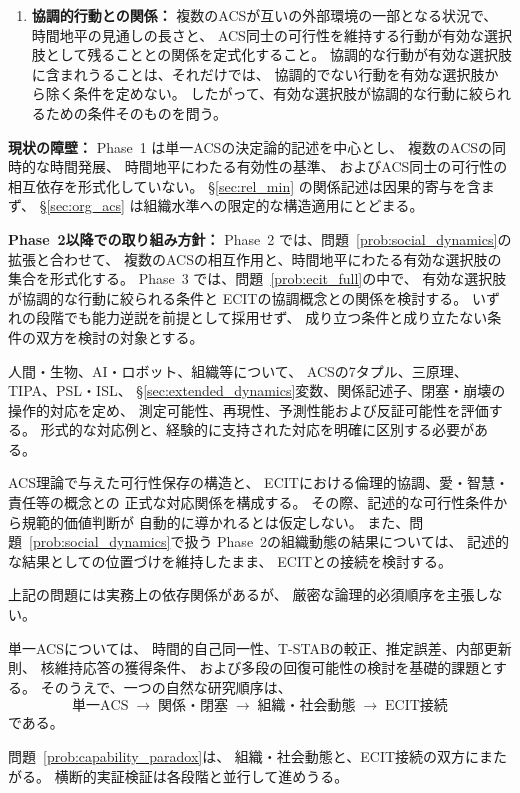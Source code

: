 \begin{problem}
\begin{enumerate}
  \item[(iii)] \textbf{協調的行動との関係：}
  複数のACSが互いの外部環境の一部となる状況で、
  時間地平の見通しの長さと、
  ACS同士の可行性を維持する行動が有効な選択肢として残ることとの関係を定式化すること。
  協調的な行動が有効な選択肢に含まれうることは、それだけでは、
  協調的でない行動を有効な選択肢から除く条件を定めない。
  したがって、有効な選択肢が協調的な行動に絞られるための条件そのものを問う。
\end{enumerate}

\textbf{現状の障壁：}
Phase~1 は単一ACSの決定論的記述を中心とし、
複数のACSの同時的な時間発展、
時間地平にわたる有効性の基準、
およびACS同士の可行性の相互依存を形式化していない。
\S\ref{sec:rel_min} の関係記述は因果的寄与を含まず、
\S\ref{sec:org_acs} は組織水準への限定的な構造適用にとどまる。

\textbf{Phase~2以降での取り組み方針：}
Phase~2 では、問題~\ref{prob:social_dynamics}の拡張と合わせて、
複数のACSの相互作用と、時間地平にわたる有効な選択肢の集合を形式化する。
Phase~3 では、問題~\ref{prob:ecit_full}の中で、
有効な選択肢が協調的な行動に絞られる条件と
ECITの協調概念との関係を検討する。
いずれの段階でも能力逆説を前提として採用せず、
成り立つ条件と成り立たない条件の双方を検討の対象とする。
\end{problem}

\begin{problem}[横断的対応付けと実証的検証]
\label{prob:cross_domain}
人間・生物、AI・ロボット、組織等について、
ACSの7タプル、三原理、TIPA、PSL・ISL、
\S\ref{sec:extended_dynamics}変数、関係記述子、閉塞・崩壊の操作的対応を定め、
測定可能性、再現性、予測性能および反証可能性を評価する。
形式的な対応例と、経験的に支持された対応を明確に区別する必要がある。
\end{problem}

\begin{problem}[ECITとの正式接続]
\label{prob:ecit_full}
ACS理論で与えた可行性保存の構造と、
ECITにおける倫理的協調、愛・智慧・責任等の概念との
正式な対応関係を構成する。
その際、記述的な可行性条件から規範的価値判断が
自動的に導かれるとは仮定しない。
また、問題~\ref{prob:social_dynamics}で扱う
Phase~2の組織動態の結果については、
記述的な結果としての位置づけを維持したまま、
ECITとの接続を検討する。
\end{problem}

\begin{remark}[未解決問題の依存関係]
\label{rem:problem_dependencies}
上記の問題には実務上の依存関係があるが、
厳密な論理的必須順序を主張しない。

単一ACSについては、
時間的自己同一性、T-STABの較正、推定誤差、内部更新則、
核維持応答の獲得条件、
および多段の回復可能性の検討を基礎的課題とする。
そのうえで、一つの自然な研究順序は、
\[
  \text{単一ACS}
  \;\longrightarrow\;
  \text{関係・閉塞}
  \;\longrightarrow\;
  \text{組織・社会動態}
  \;\longrightarrow\;
  \text{ECIT接続}
\]
である。

問題~\ref{prob:capability_paradox}は、
組織・社会動態と、ECIT接続の双方にまたがる。
横断的実証検証は各段階と並行して進めうる。
\end{remark}

